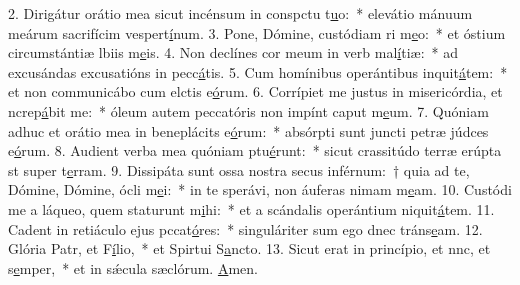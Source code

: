 2. Dirigátur orátio mea sicut incénsum in conspctu t\uline{u}o:~* elevátio mánuum meárum sacrifícim vespert\uline{í}num.
3. Pone, Dómine, custódiam ri m\uline{e}o:~* et óstium circumstántiæ lbiis m\uline{e}is.
4. Non declínes cor meum in verb mal\uline{í}tiæ:~* ad excusándas excusatións in pecc\uline{á}tis.
5. Cum homínibus operántibus inquit\uline{á}tem:~* et non communicábo cum elctis e\uline{ó}rum.
6. Corrípiet me justus in misericórdia, et ncrep\uline{á}bit me:~* óleum autem peccatóris non impínt caput m\uline{e}um.
7. Quóniam adhuc et orátio mea in beneplácits e\uline{ó}rum:~* absórpti sunt juncti petræ júdces e\uline{ó}rum.
8. Audient verba mea quóniam ptu\uline{é}runt:~* sicut crassitúdo terræ erúpta st super t\uline{e}rram.
9. Dissipáta sunt ossa nostra secus inférnum:~† quia ad te, Dómine, Dómine, ócli m\uline{e}i:~* in te sperávi, non áuferas nimam m\uline{e}am.
10. Custódi me a láqueo, quem staturunt m\uline{i}hi:~* et a scándalis operántium niquit\uline{á}tem.
11. Cadent in retiáculo ejus pccat\uline{ó}res:~* singuláriter sum ego dnec tráns\uline{e}am.
12. Glória Patr, et F\uline{í}lio,~* et Spirtui S\uline{a}ncto.
13. Sicut erat in princípio, et nnc, et s\uline{e}mper,~* et in sǽcula sæclórum. \uline{A}men.
